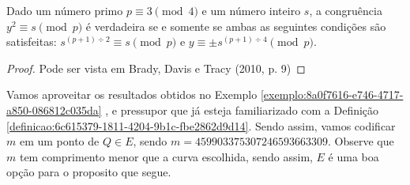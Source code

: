 \begin{teorema}\label{teorema:b140d429-6eb4-4bec-94f2-82544494032d}
	Dado um número primo $p \equiv 3 \pmod{4}$ e um número inteiro $s$, a congruência $y^2 \equiv s \pmod{p}$ é verdadeira se e somente se ambas as seguintes condições são satisfeitas: $s^{(p + 1)\div 2 } \equiv s \pmod{p}$ e $y \equiv \pm s^{(p + 1)\div 4 } \pmod{p}$.
\end{teorema}

\begin{proof}
	Pode ser vista em Brady, Davis e Tracy (2010, p. 9)
\end{proof}

Vamos aproveitar os resultados obtidos no Exemplo
\ref{exemplo:8a0f7616-e746-4717-a850-086812c035da} , e pressupor que já esteja
familiarizado com a Definição
\ref{definicao:6c615379-1811-4204-9b1c-fbe2862d9d14}. Sendo assim, vamos
codificar $m$ em um ponto de $Q \in E$, sendo $m = 459903375307246593663309$.
Observe que $m$ tem comprimento menor que a curva escolhida, sendo assim, $E$ é
uma boa opção para o proposito que segue.

